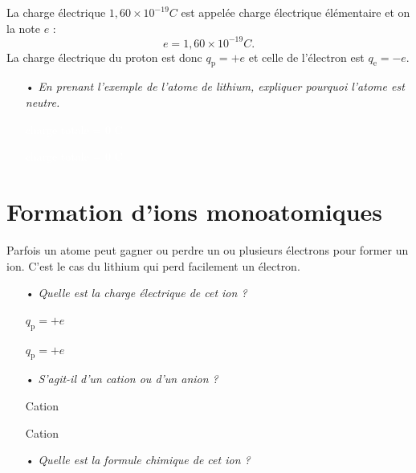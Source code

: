 \documentclass[12pt,a4paper]{article}
\begin{document}
La charge électrique $\unit{1{,}60\times10^{-19}}{C}$ est appelée charge électrique élémentaire et on la note $e$ :
\[
e = \unit{1{,}60\times10^{-19}}{C}.
\]
La charge électrique du proton est donc $q_\mathrm{p} = +e$ et celle de l'électron est $q_\mathrm{e} = -e$.

\begin{itemize}
\item[•] \emph{En prenant l'exemple de l'atome de lithium, expliquer pourquoi l'atome est neutre.}

\textcolor{white}{charge totale = 0 C}

\textcolor{white}{charge totale = 0 C}
\end{itemize}

\section{Formation d'ions monoatomiques}

Parfois un atome peut gagner ou perdre un ou plusieurs électrons pour former un ion.
C'est le cas du lithium qui perd facilement un électron.
\begin{itemize}
\item[•] \emph{Quelle est la charge électrique de cet ion ?}

{\color{white} $q_\mathrm{p} = +e$}

{\color{white} $q_\mathrm{p} = +e$}

\item[•] \emph{S'agit-il d'un cation ou d'un anion ?}

{\color{white} Cation}

{\color{white} Cation}

\item[•] \emph{Quelle est la formule chimique de cet ion ?}
\end{itemize}


\end{document}
